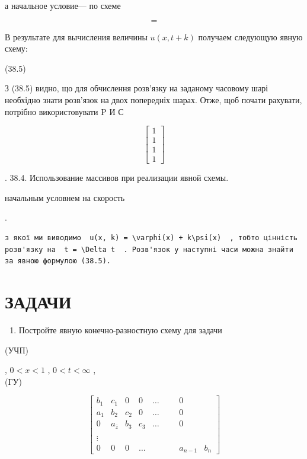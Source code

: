 \documentclass[
  ukrainian,
]{article}
\providecommand{\tightlist}{%
  \setlength{\itemsep}{0pt}\setlength{\parskip}{0pt}}
\begin{document}
а начальное условие--- по схеме

\[
=
\]

В результате для вычисления величины \(u(x, t+k)\) получаем следующую
явную схему:

(38.5)

З (38.5) видно, що для обчислення розв'язку на заданому часовому шарі
необхідно знати розв'язок на двох попередніх шарах. Отже, щоб почати
рахувати, потрібно використовувати P И С

\[
\begin{bmatrix} 1 \\ 1 \\ 1 \\ 1 \end{bmatrix}
\]

. 38.4. Использование массивов при реализации явной схемы.

начальным условнем на скорость

.

\begin{verbatim}
з якої ми виводимо  u(x, k) = \varphi(x) + k\psi(x)  , тобто цінність розв'язку на  t = \Delta t  . Розв'язок у наступні часи можна знайти за явною формулою (38.5).
\end{verbatim}

\section{ЗАДАЧИ}\label{ux437ux430ux434ux430ux447ux438-7}

\begin{enumerate}
\def\labelenumi{\arabic{enumi}.}
\tightlist
\item
  Постройте явную конечно-разностную схему для задачи
\end{enumerate}

(УЧП)

, \(0 < x < 1\) , \(0 < t < \infty\) ,\\
(ГУ)

\[
\begin{bmatrix} b_1 & c_1 & 0 & 0 & \dots & & & 0 \\ a_1 & b_2 & c_2 & 0 & \dots & & & 0 \\ 0 & a_{\bar{z}} & b_3 & c_3 & \dots & & & 0 \\ & & & & & & & & \\ \vdots & & & & & & & & \\ 0 & 0 & 0 & \dots & & & & a_{n-1} & b_n \end{bmatrix}
\]
\end{document}
